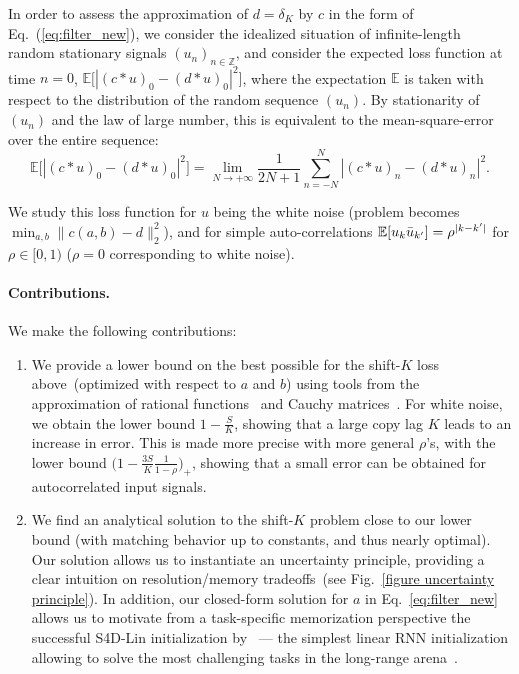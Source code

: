 In order to assess the approximation of $d = \delta_K$ by $c$ in the form of Eq.~(\ref{eq:filter_new}), we consider the idealized situation of infinite-length random stationary signals $(u_n)_{n \in \mathbb{Z}}$, and consider the expected loss function at time $n=0$, $\mathbb{E} \big[  | (c \ast u)_0 - (d \ast u)_0|^2 \big]$, where the expectation $\mathbb{E}$ is taken with respect to the distribution of the random sequence $(u_n)$. By stationarity of $(u_n)$ and the law of large number, this is equivalent to the mean-square-error over the entire sequence:
\begin{equation}
\label{loss}
\mathbb{E} \big[  | (c \ast u)_0 - (d \ast u)_0|^2 \big] = \lim_{N \to +\infty} \frac{1}{2N+1} \sum_{n = - N}^N  | (c \ast u)_n - (d \ast u)_n|^2
.\end{equation}

We study this loss function for $u$ being the white noise (problem becomes $\min_{a,b}\| c(a,b) - d \|_2^2$), and for simple auto-correlations ${\mathbb E}[u_k \bar{u}_{k'}] = \rho^{|k-k'|}$ for $\rho \in [0,1)$ ($\rho=0$ corresponding to white noise).

\paragraph{Contributions.} We make the following contributions:
\begin{enumerate}
    
    \item We provide a lower bound 
    on the best possible for the shift-$K$ loss above~(optimized with respect to $a$ and $b$) using tools from the approximation of rational functions~\citep{baratchart2016minimax} and Cauchy matrices~\citep{yang2003generalized}. For white noise, we obtain the lower bound $1- \frac{S}{K}$, showing that a large copy lag $K$ leads to an increase in error. This is made more precise with more general $\rho$'s, with the lower bound $\big(1 - \frac{3S}{K} \frac{1}{1-\rho} \big)_+$, showing that a small error can be obtained for autocorrelated input signals.
    
    

    \item We find an analytical solution to the shift-$K$ problem close to our lower bound (with matching behavior up to constants, and thus nearly optimal). Our solution allows us to instantiate an uncertainty principle, providing a clear intuition on resolution/memory tradeoffs~(see Fig.~\ref{figure uncertainty principle}). In addition, our closed-form solution for $a$ in Eq.~\eqref{eq:filter_new} allows us to motivate from a task-specific memorization perspective the successful S4D-Lin initialization by~\citet{gu2022parameterization} --- the simplest linear RNN initialization allowing to solve the most challenging tasks in the long-range arena~\citep{tay2020long}.
\end{enumerate}


